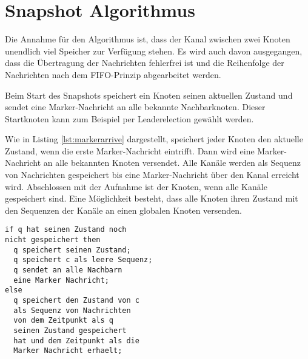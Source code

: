 \section{Snapshot Algorithmus}
\label{sec:snapshotalg}
Die Annahme für den Algorithmus ist, dass der Kanal zwischen zwei Knoten unendlich
viel Speicher zur Verfügung stehen. Es wird auch davon ausgegangen, dass die
Übertragung der Nachrichten fehlerfrei ist und die Reihenfolge der Nachrichten
nach dem FIFO-Prinzip abgearbeitet werden.

Beim Start des Snapshots speichert ein Knoten seinen aktuellen Zustand und sendet 
eine Marker-Nachricht an alle bekannte Nachbarknoten. Dieser Startknoten kann
zum Beispiel per Leaderelection gewählt werden.

Wie in Listing \ref{lst:markerarrive} dargestellt, speichert jeder Knoten den
aktuelle Zustand, wenn die erste Marker-Nachricht eintrifft. Dann wird eine
Marker-Nachricht an alle bekannten Knoten versendet.  Alle Kanäle werden als
Sequenz von Nachrichten gespeichert bis eine Marker-Nachricht über den Kanal
erreicht wird. Abschlossen mit der Aufnahme ist der Knoten, wenn alle Kanäle
gespeichert sind.  Eine Möglichkeit besteht, dass alle Knoten ihren Zustand mit
den Sequenzen der Kanäle an einen globalen Knoten versenden.

\begin{lstlisting}[caption={Pseudo Ablauf, wenn Marker Nachricht über den Kanal c den Knoten q erreicht. \cite{snapshotChandyLamport}}, label=lst:markerarrive]
if q hat seinen Zustand noch
nicht gespeichert then
  q speichert seinen Zustand;
  q speichert c als leere Sequenz;
  q sendet an alle Nachbarn
  eine Marker Nachricht;
else
  q speichert den Zustand von c
  als Sequenz von Nachrichten
  von dem Zeitpunkt als q
  seinen Zustand gespeichert
  hat und dem Zeitpunkt als die
  Marker Nachricht erhaelt;
\end{lstlisting}

